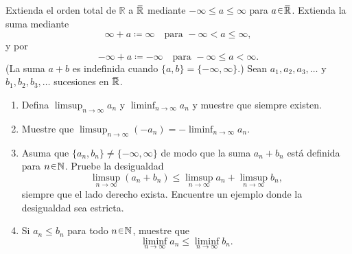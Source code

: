 \setcounter{neje}{13}
\begin{nejer}
Extienda el orden total de $\mathbb{R}$ a $\ubar{\mathbb{R}}$ mediante $-\infty \leq a \leq \infty$ para $a \en \ubar{\mathbb{R}}$. Extienda la suma mediante
$$
\infty + a \coloneq \infty \quad \text{para } -\infty < a \leq \infty,
$$
y por
$$
-\infty + a \coloneq -\infty \quad \text{para } -\infty \leq a < \infty.
$$
(La suma $a + b$ es indefinida cuando $\{a, b\} = \{-\infty, \infty\}$.) Sean $a_1, a_2, a_3, \dots$ y $b_1, b_2, b_3, \dots$ sucesiones en $\ubar{\mathbb{R}}$.

\begin{enumerate}[label = (\roman*)]
\item Defina $\limsup_{n \to \infty} a_n$ y $\liminf_{n \to \infty} a_n$ y muestre que siempre existen.

\item Muestre que $\limsup_{n \to \infty} (-a_n) = -\liminf_{n \to \infty} a_n$.

\item Asuma que $\{a_n, b_n\} \neq \{-\infty, \infty\}$ de modo que la suma $a_n + b_n$ está definida para $n \en \mathbb{N}$. Pruebe la desigualdad
$$
\limsup_{n \to \infty} (a_n + b_n) \leq \limsup_{n \to \infty} a_n + \limsup_{n \to \infty} b_n,
$$
siempre que el lado derecho exista. Encuentre un ejemplo donde la desigualdad sea estricta.

\item Si $a_n \leq b_n$ para todo $n \en \mathbb{N}$, muestre que
$$
\liminf_{n \to \infty} a_n \leq \liminf_{n \to \infty} b_n.
$$
\end{enumerate}
\end{nejer}
